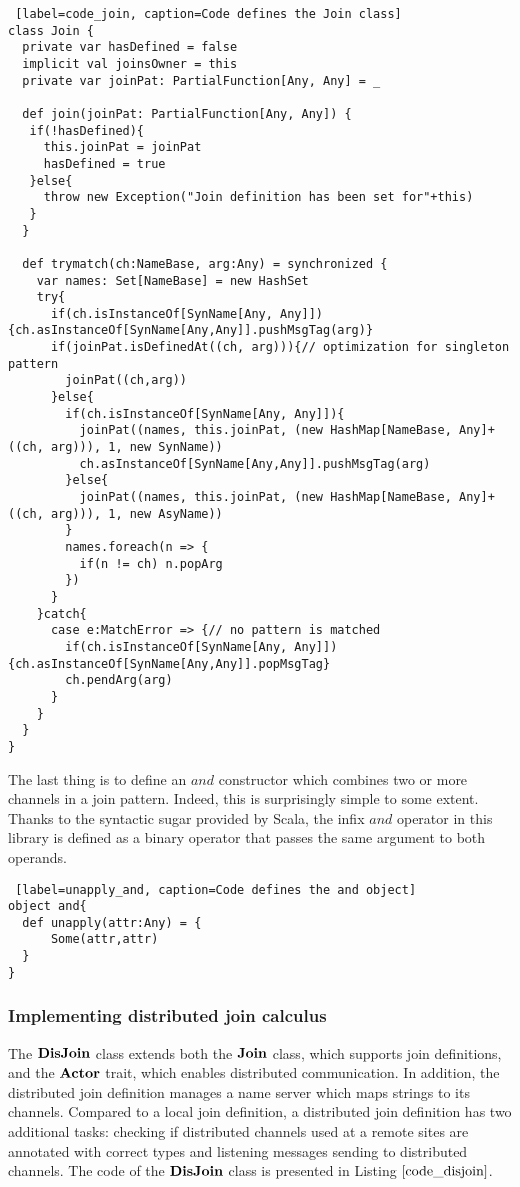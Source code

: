 \begin{lstlisting} [label=code_join, caption=Code defines the Join class]
class Join {
  private var hasDefined = false
  implicit val joinsOwner = this
  private var joinPat: PartialFunction[Any, Any] = _

  def join(joinPat: PartialFunction[Any, Any]) { 
   if(!hasDefined){
     this.joinPat = joinPat
     hasDefined = true
   }else{
     throw new Exception("Join definition has been set for"+this)
   }
  }
   
  def trymatch(ch:NameBase, arg:Any) = synchronized {
    var names: Set[NameBase] = new HashSet
    try{
      if(ch.isInstanceOf[SynName[Any, Any]]) {ch.asInstanceOf[SynName[Any,Any]].pushMsgTag(arg)}
      if(joinPat.isDefinedAt((ch, arg))){// optimization for singleton pattern        
        joinPat((ch,arg))
      }else{
        if(ch.isInstanceOf[SynName[Any, Any]]){
          joinPat((names, this.joinPat, (new HashMap[NameBase, Any]+((ch, arg))), 1, new SynName))            
          ch.asInstanceOf[SynName[Any,Any]].pushMsgTag(arg)          
        }else{
          joinPat((names, this.joinPat, (new HashMap[NameBase, Any]+((ch, arg))), 1, new AsyName))
        }
        names.foreach(n => {
          if(n != ch) n.popArg
        })
      }
    }catch{
      case e:MatchError => {// no pattern is matched
        if(ch.isInstanceOf[SynName[Any, Any]]) {ch.asInstanceOf[SynName[Any,Any]].popMsgTag}
        ch.pendArg(arg)
      }
    }
  }
}
\end{lstlisting}

The last thing is to define an $and$ constructor which combines two or more channels in a join pattern.  Indeed, this is surprisingly simple to some extent.  Thanks to the syntactic sugar provided by Scala, the infix $and$ operator in this library is defined as a binary operator  that passes the same argument to both operands.

\begin{lstlisting} [label=unapply_and, caption=Code defines the and object]
object and{
  def unapply(attr:Any) = {
      Some(attr,attr)
  }
}
\end{lstlisting}

\subsubsection{Implementing distributed join calculus}
\label{imp_dis_join}

The $\bf{DisJoin}$ class extends both the $\bf{Join}$ class, which supports join definitions, and the $\bf{Actor}$ trait, which enables distributed communication.  In addition, the distributed join definition manages a name server which maps strings to its channels.  Compared to a local join definition, a distributed join definition has two additional tasks: checking if distributed channels used at a remote sites are annotated with correct types and listening messages sending to distributed channels.  The code of the $\bf{DisJoin}$ class is presented in Listing $\ref{code_disjoin}$.


